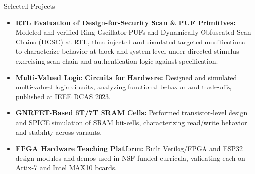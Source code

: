 \begin{rSection}{Selected Projects}
\begin{itemize}

    \item \textbf{RTL Evaluation of Design-for-Security Scan \& PUF Primitives:} Modeled and verified Ring-Oscillator PUFs and Dynamically Obfuscated Scan Chains (DOSC) at RTL, then injected and simulated targeted modifications to characterize behavior at block and system level under directed stimulus \,---\, exercising scan-chain and authentication logic against specification.
    \item \textbf{Multi-Valued Logic Circuits for Hardware:} Designed and simulated multi-valued logic circuits, analyzing functional behavior and trade-offs; published at IEEE DCAS 2023.
    \item \textbf{GNRFET-Based 6T/7T SRAM Cells:} Performed transistor-level design and SPICE simulation of SRAM bit-cells, characterizing read/write behavior and stability across variants.
    \item \textbf{FPGA Hardware Teaching Platform:} Built Verilog/FPGA and ESP32 design modules and demos used in NSF-funded curricula, validating each on Artix-7 and Intel MAX10 boards.
\end{itemize}
\end{rSection}
